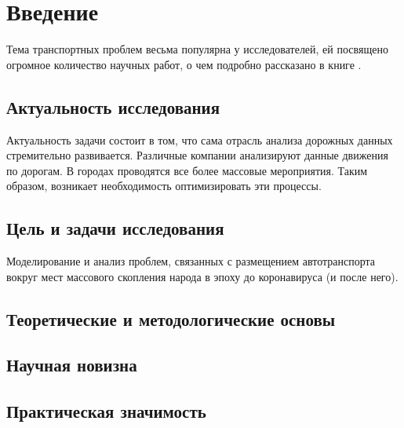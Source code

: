 \chapter{Введение}
 
Тема транспортных проблем весьма популярна у исследователей, ей посвящено
огромное количество научных работ, о чем подробно рассказано в книге \cite{gas}.
 
\section{Актуальность исследования}
 
Актуальность задачи состоит в том, что сама отрасль анализа дорожных данных
стремительно развивается. Различные компании анализируют данные движения
по дорогам. В городах проводятся все более массовые мероприятия. Таким
образом, возникает необходимость оптимизировать эти процессы.
 
\section{Цель и задачи исследования}
Моделирование и анализ проблем, связанных с размещением автотранспорта
вокруг мест массового скопления народа в эпоху до коронавируса (и после него).
 
\section{Теоретические и методологические основы}
\section{Научная новизна}
\section{Практическая значимость}
 

